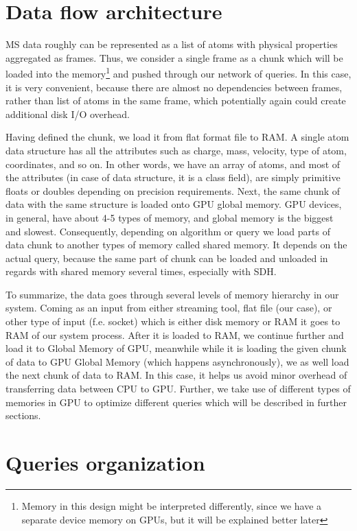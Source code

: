 \documentclass[12pt,letterpaper]{report}
\begin{document}
\section{Data flow architecture}

\hspace{3em} MS data roughly can be represented as a list of atoms with physical properties aggregated as frames. Thus, we consider a single frame as a chunk which will be loaded into the memory\footnote{Memory in this design might be interpreted differently, since we have a separate device memory on GPUs, but it will be explained better later} and pushed through our network of queries. In this case, it is very convenient, because there are almost no dependencies between frames, rather than list of atoms in the same frame, which potentially again could create additional disk I/O overhead.

Having defined the chunk, we load it from flat format file to RAM. A single atom data structure has all the attributes such as charge, mass, velocity, type of atom, coordinates, and so on. In other words, we have an array of atoms, and most of the attributes (in case of data structure, it is a class field), are simply primitive floats or doubles depending on precision requirements. Next, the same chunk of data with the same structure is loaded onto GPU global memory. GPU devices, in general, have about 4-5 types of memory, and global memory is the biggest and slowest. Consequently, depending on algorithm or query we load parts of data chunk to another types of memory called shared memory. It depends on the actual query, because the same part of chunk can be loaded and unloaded in regards with shared memory several times, especially with SDH.

To summarize, the data goes through several levels of memory hierarchy in our system. Coming as an input from either streaming tool, flat file (our case), or other type of input (f.e. socket) which is either disk memory or RAM it goes to RAM of our system process. After it is loaded to RAM, we continue further and load it to Global Memory of GPU, meanwhile while it is loading the given chunk of data to GPU Global Memory (which happens asynchronously), we as well load the next chunk of data to RAM. In this case, it helps us avoid minor overhead of transferring data between CPU to GPU. Further, we take use of different types of memories in GPU to optimize different queries which will be described in further sections.

\section{Queries organization}
\end{document}
